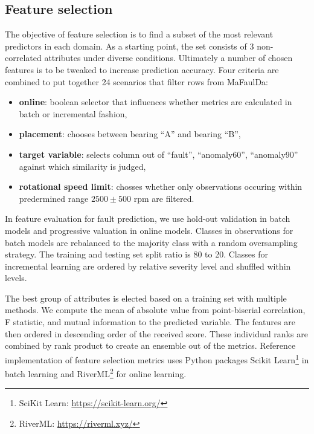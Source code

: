 \subsection{Feature selection}
The objective of feature selection is to find a subset of the most relevant predictors in each domain. As a starting point, the set consists of 3 non-correlated attributes under diverse conditions. Ultimately a number of chosen features is to be tweaked to increase prediction accuracy. Four criteria are combined to put together 24 scenarios that filter rows from MaFaulDa:
\begin{itemize}
\itemsep0pt
\item \textbf{online}: boolean selector that influences whether metrics are calculated in batch or incremental fashion,
\item \textbf{placement}: chooses between bearing ``A'' and bearing ``B'',
\item \textbf{target variable}: selects column out of ``fault'', ``anomaly60'', ``anomaly90'' against which similarity is judged,
\item \textbf{rotational speed limit}: chosses whether only observations occuring within predermined range $2500 \pm 500$ rpm are filtered.
\end{itemize}

In feature evaluation for fault prediction, we use hold-out validation in batch models and progressive valuation in online models. Classes in observations for batch models are rebalanced to the majority class with a random oversampling strategy. The training and testing set split ratio is 80 to 20. Classes for incremental learning are ordered by relative severity level and shuffled within levels. 

The best group of attributes is elected based on a training set with multiple methods. We compute the mean of absolute value from point-biserial correlation, F statistic, and mutual information to the predicted variable. The features are then ordered in descending order of the received score. These individual ranks are combined by rank product to create an ensemble out of the metrics. Reference implementation of feature selection metrics uses Python packages Scikit Learn\footnote{SciKit Learn: \url{https://scikit-learn.org/}} in batch learning and RiverML\footnote{RiverML: \url{https://riverml.xyz/}} for online learning.

